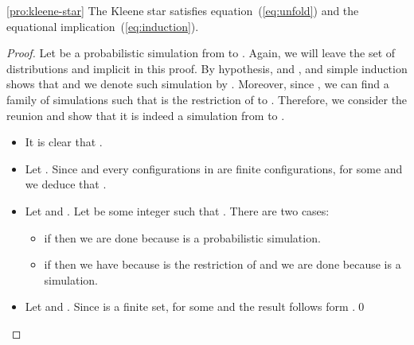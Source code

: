 \documentclass{llncs}
\newcommand{\<}{\langle}
\renewcommand{\>}{\rangle}
\begin{document}
\begin{repproposition}{\ref{pro:kleene-star}}
The Kleene star satisfies equation~(\ref{eq:unfold}) and the equational  implication~(\ref{eq:induction}).
\end{repproposition}
\begin{proof}
Let  be a probabilistic simulation from  to . Again, we will leave the set of distributions  and  implicit in this proof. By hypothesis,  and ,   and simple induction shows that  and we denote such simulation by . Moreover, since , we can find a family of simulations such that  is the restriction of  to . Therefore, we consider the reunion  and show that it is indeed a simulation from  to .
\begin{itemize}
\item It is clear that .
\item Let . Since  and every  configurations in  are finite configurations,  for some  and we deduce that .
\item Let  and . Let  be some integer such that . There are two cases:
\begin{itemize}
\item if  then we are done because  is a probabilistic simulation.
\item if  then we have  because  is the restriction of  and we are done because  is a simulation. 
\end{itemize}
\item Let  and . Since  is a finite set,  for some  and the result follows form .\qed
\end{itemize}
\end{proof}
\clearpage{}
\end{document}
